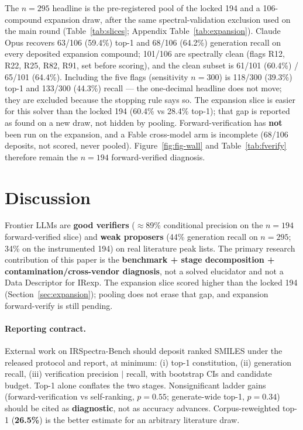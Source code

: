 \documentclass{article}
\begin{document}
The $n{=}295$ headline is the pre-registered pool of the locked 194 and a 106-compound
expansion draw, after the same spectral-validation exclusion used on the main round
(Table~\ref{tab:slices}; Appendix Table~\ref{tab:expansion}).
Claude Opus recovers 63/106 (59.4\%) top-1 and 68/106 (64.2\%) generation recall on every
deposited expansion compound; 101/106 are spectrally clean (flags R12, R22, R25, R82, R91,
set before scoring), and the clean subset is 61/101 (60.4\%) / 65/101 (64.4\%).
Including the five flags (sensitivity $n{=}300$) is 118/300 (39.3\%) top-1 and 133/300 (44.3\%)
recall --- the one-decimal headline does not move; they are excluded because the stopping
rule says so.
The expansion slice is easier for this solver than the locked 194 (60.4\% vs 28.4\% top-1);
that gap is reported as found on a new draw, not hidden by pooling.
Forward-verification has \textbf{not} been run on the expansion, and a Fable cross-model arm
is incomplete (68/106 deposits, not scored, never pooled).
Figure~\ref{fig:fig-wall} and Table~\ref{tab:fverify} therefore remain the $n{=}194$
forward-verified diagnosis.

\section{Discussion}
\label{sec:discussion}

Frontier LLMs are \textbf{good verifiers} ($\approx$89\% conditional precision on the
$n{=}194$ forward-verified slice) and \textbf{weak proposers} (44\% generation recall on
$n{=}295$; 34\% on the instrumented 194) on real literature peak lists.
The primary research contribution of this paper is the \textbf{benchmark + stage
decomposition + contamination/cross-vendor diagnosis}, not a solved elucidator and not a
Data Descriptor for IRexp.
The expansion slice scored higher than the locked 194 (Section~\ref{sec:expansion}); pooling
does not erase that gap, and expansion forward-verify is still pending.

\paragraph{Reporting contract.}
External work on IRSpectra-Bench should deposit ranked SMILES under the released protocol and
report, at minimum: (i) top-1 constitution, (ii) generation recall, (iii) verification
precision $|$ recall, with bootstrap CIs and candidate budget.
Top-1 alone conflates the two stages.
Nonsignificant ladder gains (forward-verification vs self-ranking, $p{=}0.55$; generate-wide
top-1, $p{=}0.34$) should be cited as \textbf{diagnostic}, not as accuracy advances.
Corpus-reweighted top-1 (\textbf{26.5\%}) is the better estimate for an arbitrary literature
draw.
\end{document}
